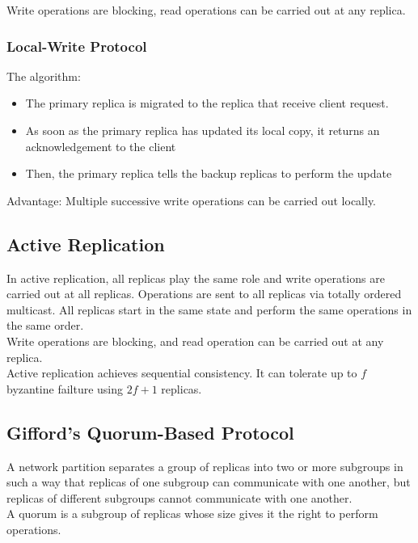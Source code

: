\begin{multicols*}{2}
\noindent Write operations are blocking, read operations can be carried out at any replica. 

\subsubsection{Local-Write Protocol}

\noindent The algorithm:
\begin{itemize}
  \item The primary replica is migrated to the replica that receive client request. 
  \item As soon as the primary replica has updated its local copy, it returns an acknowledgement to the client
  \item Then, the primary replica tells the backup replicas to perform the update
\end{itemize}

\noindent Advantage: Multiple successive write operations can be carried out locally.

\subsection{Active Replication}

\noindent In active replication, all replicas play the same role and write operations are carried out at all replicas. Operations are sent to all replicas via totally ordered multicast. All replicas start in the same state and perform the same operations in the same order. \\

\noindent Write operations are blocking, and read operation can be carried out at any replica. \\

\noindent Active replication achieves sequential consistency. It can tolerate up to $f$ byzantine failture using $2f+1$ replicas.

\subsection{Gifford’s Quorum-Based Protocol}

\noindent A network partition separates a group of replicas into two or more subgroups in such a way that replicas of one subgroup can communicate with one another, but replicas of different subgroups cannot communicate with one another. \\

\noindent A quorum is a subgroup of replicas whose size gives it the right to perform operations.\\


\end{multicols*}
